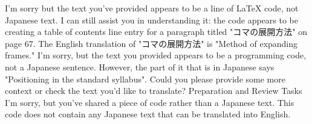 I'm sorry but the text you've provided appears to be a line of LaTeX code, not Japanese text. I can still assist you in understanding it: the code appears to be creating a table of contents line entry for a paragraph titled "コマの展開方法" on page 67. The English translation of "コマの展開方法" is "Method of expanding frames."
I'm sorry, but the text you provided appears to be a programming code, not a Japanese sentence. However, the part of it that is in Japanese says "Positioning in the standard syllabus". Could you please provide some more context or check the text you'd like to translate?
Preparation and Review Tasks
I'm sorry, but you've shared a piece of code rather than a Japanese text. This code does not contain any Japanese text that can be translated into English.

